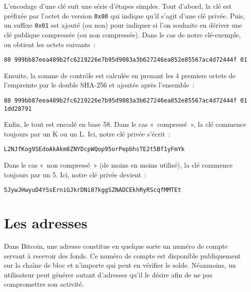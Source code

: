 L'encodage d'une clé suit une série d'étapes simples. Tout d'abord, la clé est préfixée par l'octet de version \texttt{0x80} qui indique qu'il s'agit d'une clé privée. Puis, un suffixe \texttt{0x01} est ajouté (ou non) pour indiquer si l'on souhaite en dériver une clé publique compressée (ou non compressée). Dans le cas de notre clé-exemple, on obtient les octets suivants~:

\begin{Verbatim}[fontsize=\footnotesize]
80 999bb87eea489b2fc6219226e7b95d9083a3b627246ea852e85567ac4d72444f 01
\end{Verbatim}

Ensuite, la somme de contrôle est calculée en prenant les 4 premiers octets de l'empreinte par le double SHA-256 et ajoutée après l'ensemble~:


\begin{Verbatim}[fontsize=\footnotesize]
80 999bb87eea489b2fc6219226e7b95d9083a3b627246ea852e85567ac4d72444f 01
1dd28791
\end{Verbatim}

Enfin, le tout est encodé en base 58. Dans le cas «~compressé~», la clé commence toujours par un K ou un L. Ici, notre clé privée s'écrit~:

\begin{Verbatim}[fontsize=\footnotesize]
L2NJfKog9SEdoAkAkm8ZNYDcpWQop95orPepbhsTE2t5Bf1yFmYk
\end{Verbatim}

Dans le cas «~non compressé~» (de moins en moins utilisé), la clé commence toujours par un 5. Ici, notre clé privée devient~:

\begin{Verbatim}[fontsize=\footnotesize]
5JywJHwyuD4YSsErniGJkrDNi87kggSZNADCEkhRyRScqfMMTEt
\end{Verbatim}

\section*{Les adresses}

Dans Bitcoin, une adresse constitue en quelque sorte un numéro de compte servant à recevoir des fonds. Ce numéro de compte est disponible publiquement sur la chaîne de bloc et n'importe qui peut en vérifier le solde. Néanmoins, un utilisateur peut générer autant d'adresses qu'il le désire afin de ne pas compromettre son activité.

